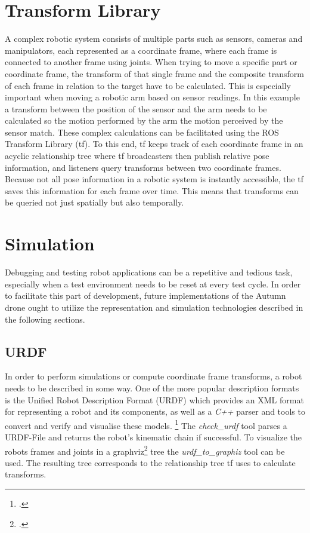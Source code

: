 \section{Transform Library}
A complex robotic system consists of multiple parts such as sensors, cameras and manipulators, each represented as a coordinate frame, where each frame is connected to another frame using joints. When trying to move a specific part or coordinate frame, the transform of that single frame and the composite transform of each frame in relation to the target have to be calculated. This is especially important when moving a robotic arm based on sensor readings. In this example a transform between the position of the sensor and the arm needs to be calculated so the motion performed by the arm the motion perceived by the sensor match.
These complex calculations can be facilitated using the ROS Transform Library (tf). To this end, tf keeps track of each coordinate frame in an acyclic relationship tree where tf broadcasters then publish relative pose information, and listeners query transforms between two coordinate frames. 
Because not all pose information in a robotic system is instantly accessible, the tf saves this information for each frame over time. This means that transforms can be queried not just spatially but also temporally.



\section{Simulation}
Debugging and testing robot applications can be a repetitive and tedious task, especially when a test environment needs to be reset at every test cycle. In order to facilitate this part of development, future implementations of the Autumn drone ought to utilize the representation and simulation technologies described in the following sections.

\subsection{URDF}
In order to perform simulations or compute coordinate frame transforms, a robot needs to be described in some way. One of the more popular description formats is the Unified Robot Description Format (URDF) which provides an XML format for representing a robot and its components, as well as a \textit{C++} parser and tools to convert and verify and visualise these models. \footcite{openSourceRoboticsFoundationURDFNodate}
The \textit{check\_urdf} tool parses a URDF-File and returns the robot's kinematic chain if successful.
To visualize the robots frames and joints in a graphviz\footcite{graphvizAuthorsAboutNodate} tree the \textit{urdf\_to\_graphiz} tool can be used. The resulting tree corresponds to the relationship tree tf uses to calculate transforms.

